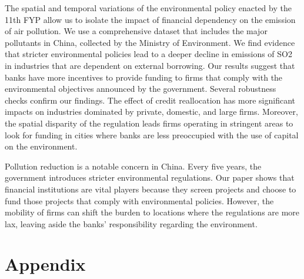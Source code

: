 \documentclass[12pt]{article}
\begin{document}
The spatial and temporal variations of the environmental policy enacted by the 11th FYP allow us to isolate the impact of financial dependency on the emission of air pollution. We use a comprehensive dataset that includes the major pollutants in China, collected by the Ministry of Environment. We find evidence that stricter environmental policies lead to a deeper decline in emissions of SO2 in industries that are dependent on external borrowing. Our results suggest that banks have more incentives to provide funding to firms that comply with the environmental objectives announced by the government. Several robustness checks confirm our findings. The effect of credit reallocation has more significant impacts on industries dominated by private, domestic, and large firms. Moreover, the spatial disparity of the regulation leads firms operating in stringent areas to look for funding in cities where banks are less preoccupied with the use of capital on the environment.  

Pollution reduction is a notable concern in China. Every five years, the government introduces stricter environmental regulations. Our paper shows that financial institutions are vital players because they screen projects and choose to fund those projects that comply with environmental policies. However, the mobility of firms can shift the burden to locations where the regulations are more lax, leaving aside the banks' responsibility regarding the environment.


\singlespacing
\setlength\bibsep{0pt}
\pagebreak



\clearpage


\section*{Appendix} \label{sec:appendixa}
\end{document}
